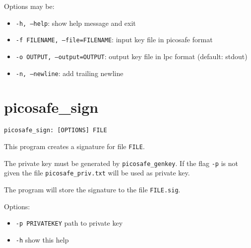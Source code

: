 Options may be:
\begin{itemize}
  \item \texttt{-h, --help}: show help message and exit  
  \item \texttt{-f FILENAME, --file=FILENAME}: input key file in picosafe format
  \item \texttt{-o OUTPUT, --output=OUTPUT}: output key file in lpc format (default: stdout)
  \item \texttt{-n, --newline}: add trailing newline
\end{itemize}


\section{picosafe\_sign}
\label{picosafe_genkey_sign}

\texttt{picosafe\_sign: [OPTIONS] FILE}

This program creates a signature for file \texttt{FILE}.

The private key must be generated by \texttt{picosafe\_genkey}. If the flag
\texttt{-p} is not given the file \texttt{picosafe\_priv.txt} will be used as private key.

The program will store the signature to the file \texttt{FILE.sig}.

Options:
\begin{itemize}
  \item \texttt{-p PRIVATEKEY} path to private key
  \item \texttt{-h} show this help
\end{itemize}

